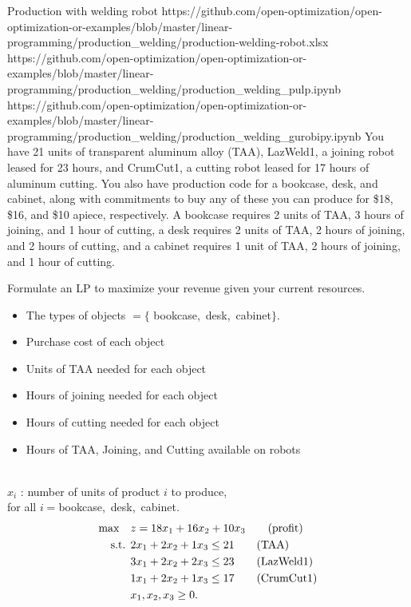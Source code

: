 \begin{examplewithallcode}{Production with welding robot}
{https://github.com/open-optimization/open-optimization-or-examples/blob/master/linear-programming/production_welding/production-welding-robot.xlsx}
{https://github.com/open-optimization/open-optimization-or-examples/blob/master/linear-programming/production_welding/production_welding_pulp.ipynb}
{https://github.com/open-optimization/open-optimization-or-examples/blob/master/linear-programming/production_welding/production_welding_gurobipy.ipynb}
\label{example:welding-robot}
You have 21 units of transparent aluminum alloy (TAA), LazWeld1, a joining robot leased for 23 hours, and CrumCut1, a cutting robot leased for 17 hours of aluminum cutting. You also have production code for a bookcase, desk, and cabinet, along with commitments to buy any of these you can produce for \$18,  \$16, and  \$10 apiece, respectively.  A bookcase requires 2 units of TAA, 3 hours of joining, and 1 hour of cutting, a desk requires 2 units of TAA, 2 hours of joining, and 2 hours of cutting, and a cabinet requires 1 unit of TAA, 2 hours of joining, and 1 hour of cutting. 

Formulate an LP to maximize your revenue given your current resources.
\end{examplewithallcode}

\begin{solution}

\noindent\medskip {}
\begin{itemize}
\item The types of objects $ = \{$ bookcase,~desk,~cabinet$\}$.
\end{itemize}
\medskip {} 
\begin{itemize}
\item Purchase cost of each object
\item Units of TAA needed for each object
\item Hours of joining needed for each object
\item Hours of cutting needed for each object
\item Hours of TAA, Joining, and Cutting available on robots
\end{itemize}

\noindent\medskip {} \\
$x_i$ : number of units of product $i$ to produce, \\
for all $ i = $bookcase,~desk,~cabinet.\\

\noindent \medskip {}
\begin{align*}
\max \quad & z = 18x_1 + 16x_2 + 10x_3   \tag{profit} \\
\mbox{ s.t. }        & 2x_1 + 2x_2 + 1x_3 \le 21   \tag{TAA} \\
& 3x_1 + 2x_2 + 2x_3 \le 23   \tag{LazWeld1} \\
& 1x_1 + 2x_2 + 1x_3 \le 17   \tag{CrumCut1} \\
& x_1, x_2, x_3 \ge 0.
\end{align*}
\end{solution}

